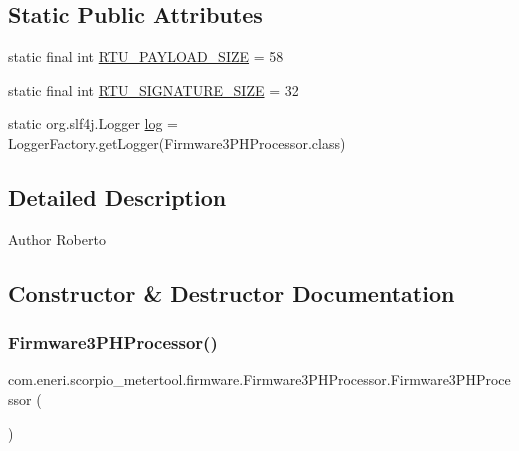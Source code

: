 \subsection*{Static Public Attributes}
\begin{DoxyCompactItemize}
\item 
static final int \hyperlink{classcom_1_1eneri_1_1scorpio__metertool_1_1firmware_1_1_firmware3_p_h_processor_ad02b68c1c4e01b306cc3769bc265ddc5}{R\+T\+U\+\_\+\+P\+A\+Y\+L\+O\+A\+D\+\_\+\+S\+I\+ZE} = 58
\item 
static final int \hyperlink{classcom_1_1eneri_1_1scorpio__metertool_1_1firmware_1_1_firmware3_p_h_processor_a2ae7c0154c2dc91af903eec1ac3e8e72}{R\+T\+U\+\_\+\+S\+I\+G\+N\+A\+T\+U\+R\+E\+\_\+\+S\+I\+ZE} = 32
\item 
static org.\+slf4j.\+Logger \hyperlink{classcom_1_1eneri_1_1scorpio__metertool_1_1firmware_1_1_firmware3_p_h_processor_a62e18400a428abdcf7104d37ec4d4869}{log} = Logger\+Factory.\+get\+Logger(Firmware3\+P\+H\+Processor.\+class)
\end{DoxyCompactItemize}


\subsection{Detailed Description}
\begin{DoxyAuthor}{Author}
Roberto 
\end{DoxyAuthor}


\subsection{Constructor \& Destructor Documentation}
\mbox{\label{classcom_1_1eneri_1_1scorpio__metertool_1_1firmware_1_1_firmware3_p_h_processor_a4b5059b379bcbaadce94780f9f3162a8}} 
\subsubsection{\texorpdfstring{Firmware3\+P\+H\+Processor()}{Firmware3PHProcessor()}}
{\footnotesize\ttfamily com.\+eneri.\+scorpio\+\_\+metertool.\+firmware.\+Firmware3\+P\+H\+Processor.\+Firmware3\+P\+H\+Processor (\begin{DoxyParamCaption}{ }\end{DoxyParamCaption})}



